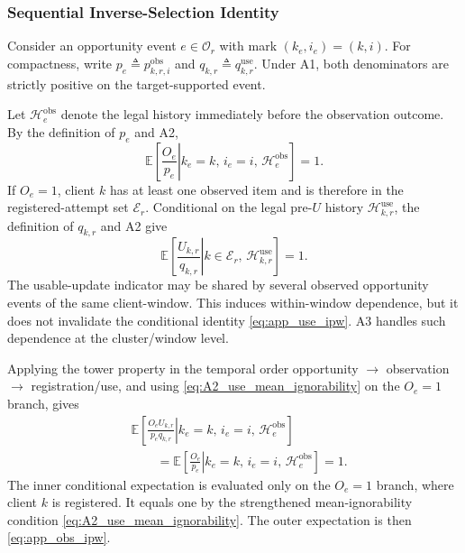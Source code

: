 \subsubsection{Sequential Inverse-Selection Identity}

Consider an opportunity event $e\in\mathcal{O}_r$ with mark
$(k_e,i_e)=(k,i)$.  For compactness, write
$p_e\triangleq p^{\mathrm{obs}}_{k,r,i}$ and
$q_{k,r}\triangleq q^{\mathrm{use}}_{k,r}$.
Under A1, both denominators are strictly positive on the target-supported event.

Let $\mathcal{H}^{\mathrm{obs}}_e$ denote the legal history immediately before
the observation outcome.  By the definition of $p_e$ and A2,
\begin{equation}
    \mathbb{E}
    \left[
    \left.
    \frac{O_e}{p_e}
    \right|
    k_e=k,\,
    i_e=i,\,
    \mathcal{H}^{\mathrm{obs}}_e
    \right]
    =1.
    \label{eq:app_obs_ipw}
\end{equation}
If $O_e=1$, client $k$ has at least one observed item and is therefore in the
registered-attempt set $\mathcal{E}_r$.  Conditional on the legal pre-$U$
history $\mathcal{H}^{\mathrm{use}}_{k,r}$, the definition of $q_{k,r}$ and A2
give
\begin{equation}
    \mathbb{E}
    \left[
    \left.
    \frac{U_{k,r}}{q_{k,r}}
    \right|
    k\in\mathcal{E}_r,\,
    \mathcal{H}^{\mathrm{use}}_{k,r}
    \right]
    =1.
    \label{eq:app_use_ipw}
\end{equation}
The usable-update indicator may be shared by several observed opportunity
events of the same client-window.  This induces within-window dependence, but
it does not invalidate the conditional identity
\eqref{eq:app_use_ipw}.  A3 handles such dependence at the
cluster/window level.

Applying the tower property in the temporal order
opportunity $\rightarrow$ observation $\rightarrow$ registration/use, and using
\eqref{eq:A2_use_mean_ignorability} on the $O_e=1$ branch, gives
\begin{align}
 &\mathbb{E}\!\left[
 \left.
 \frac{O_eU_{k,r}}{p_eq_{k,r}}
 \right|
 k_e=k,\,i_e=i,\,\mathcal{H}^{\mathrm{obs}}_e
 \right]
 \nonumber\\
 &\qquad=
 \mathbb{E}\!\left[
 \left.
 \frac{O_e}{p_e}
 \right|
 k_e=k,\,i_e=i,\,\mathcal{H}^{\mathrm{obs}}_e
 \right]
 =1.
 \label{eq:app_sequential_identity}
\end{align}
The inner conditional expectation is evaluated only on the $O_e=1$ branch,
where client $k$ is registered.  It equals one by the strengthened
mean-ignorability condition \eqref{eq:A2_use_mean_ignorability}.  The outer
expectation is then \eqref{eq:app_obs_ipw}.

